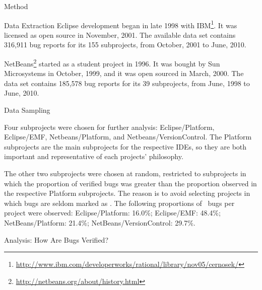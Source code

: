 \begin{section}{Method}
\begin{subsection}{Data Extraction}
	Eclipse development began in late 1998 with IBM\footnote{\url{http://www.ibm.com/developerworks/rational/library/nov05/cernosek/}}. It was licensed as open source in November, 2001. The available data set contains 316,911 bug reports for its 155 subprojects, from October, 2001 to June, 2010.
		
	NetBeans\footnote{\url{http://netbeans.org/about/history.html}} started  as a student project in 1996. It was bought by Sun Microsystems in October, 1999, and it was open sourced in March, 2000. The data set contains 185,578 bug reports for its 39 subprojects, from June, 1998 to June, 2010.
	
\end{subsection}

\begin{subsection}{Data Sampling}

	Four subprojects were chosen for further analysis: Eclipse/Platform, Eclipse/EMF, Netbeans/Platform, and Netbeans/VersionControl. The Platform subprojects are the main subprojects for the respective IDEs, so they are both important and representative of each projects' philosophy. 
	
	The other two subprojects were chosen at random, restricted to subprojects in which the proportion of verified bugs was greater than the proportion observed in the respective Platform subprojects. The reason is to avoid selecting projects in which bugs are seldom marked as \VERIFIED. The following proportions of \VERIFIED\ bugs per project were observed: Eclipse/Platform: 16.0\%; Eclipse/EMF: 48.4\%; NetBeans/Platform: 21.4\%; NetBeans/VersionControl: 29.7\%.
	
	
	
\end{subsection}

\begin{subsection}{Analysis: How Are Bugs Verified?}


\end{subsection}
\end{section}
